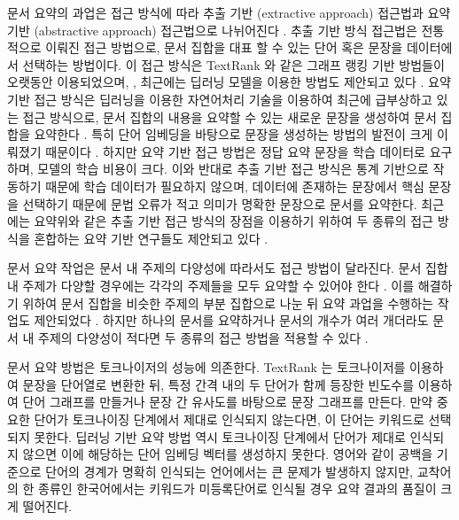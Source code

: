 \documentclass[11pt]{article}
\begin{document}
문서 요약의 과업은 접근 방식에 따라 추출 기반 (extractive approach) 접근법과 요약 기반 (abstractive approach) 접근법으로 나뉘어진다 \citep{yao2017recent}.
추출 기반 방식 접근법은 전통적으로 이뤄진 접근 방법으로, 문서 집합을 대표 할 수 있는 단어 혹은 문장을 데이터에서 선택하는 방법이다.
이 접근 방식은 TextRank \citep{mihalcea2004textrank} 와 같은 그래프 랭킹 기반 방법들이 오랫동안 이용되었으며,  \citep{parveen2015topical, narayan2018ranking}, 최근에는 딥러닝 모델을 이용한 방법도 제안되고 있다 \citep{rush2015neural}.
요약 기반 접근 방식은 딥러닝을 이용한 자연어처리 기술을 이용하여 최근에 급부상하고 있는 접근 방식으로, 문서 집합의 내용을 요약할 수 있는 새로운 문장을 생성하여 문서 집합을 요약한다 \citep{nallapati2016abstractive}.
특히 단어 임베딩을 바탕으로 문장을 생성하는 방법의 발전이 크게 이뤄졌기 때문이다 \citep{bengio2003neural, donahue2015long, xu2015show, nallapati2016abstractive}.
하지만 요약 기반 접근 방법은 정답 요약 문장을 학습 데이터로 요구하며, 모델의 학습 비용이 크다.
이와 반대로 추출 기반 접근 방식은 통계 기반으로 작동하기 때문에 학습 데이터가 필요하지 않으며, 데이터에 존재하는 문장에서 핵심 문장을 선택하기 때문에 문법 오류가 적고 의미가 명확한 문장으로 문서를 요약한다.
최근에는 요약위와 같은 추출 기반 접근 방식의 장점을 이용하기 위하여 두 종류의 접근 방식을 혼합하는 요약 기반 연구들도 제안되고 있다 \citep{banerjee2015multi, bing2015abstractive, gu2016incorporating}.

문서 요약 작업은 문서 내 주제의 다양성에 따라서도 접근 방법이 달라진다.
문서 집합 내 주제가 다양할 경우에는 각각의 주제들을 모두 요약할 수 있어야 한다 \citep{yao2017recent}.
이를 해결하기 위하여 문서 집합을 비슷한 주제의 부분 집합으로 나눈 뒤 요약 과업을 수행하는 작업도 제안되었다 \citep{filippova2008sentence, filippova2010multi}.
하지만 하나의 문서를 요약하거나 문서의 개수가 여러 개더라도 문서 내 주제의 다양성이 적다면 두 종류의 접근 방법을 적용할 수 있다 \citep{goldstein2000multi, lin2002single}.

문서 요약 방법은 토크나이저의 성능에 의존한다.
TextRank 는 토크나이저를 이용하여 문장을 단어열로 변환한 뒤, 특정 간격 내의 두 단어가 함께 등장한 빈도수를 이용하여 단어 그래프를 만들거나 문장 간 유사도를 바탕으로 문장 그래프를 만든다.
만약 중요한 단어가 토크나이징 단계에서 제대로 인식되지 않는다면, 이 단어는 키워드로 선택되지 못한다.
딥러닝 기반 요약 방법 역시 토크나이징 단계에서 단어가 제대로 인식되지 않으면 이에 해당하는 단어 임베딩 벡터를 생성하지 못한다.
영어와 같이 공백을 기준으로 단어의 경계가 명확히 인식되는 언어에서는 큰 문제가 발생하지 않지만, 교착어의 한 종류인 한국어에서는 키워드가 미등록단어로 인식될 경우 요약 결과의 품질이 크게 떨어진다.
\end{document}
